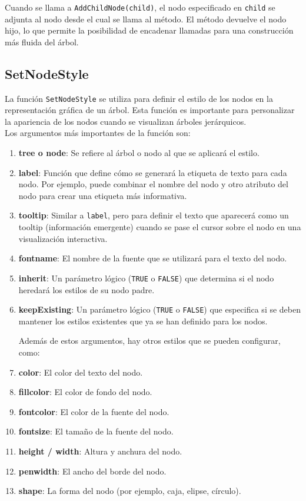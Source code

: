 \documentclass[12pt]{report}\usepackage[]{graphicx}\usepackage[dvipsnames]{xcolor}
\begin{document}
 	Cuando se llama a \texttt{AddChildNode(child)}, el nodo especificado en \texttt{child} se adjunta al nodo desde el cual se llama al método. El método devuelve el nodo hijo, lo que permite la posibilidad de encadenar llamadas para una construcción más fluida del árbol.
 	
 	\subsection{SetNodeStyle}
 	
 	La función \texttt{SetNodeStyle} se utiliza para definir el estilo de los nodos en la representación gráfica de un árbol. Esta función es importante para personalizar la apariencia de los nodos cuando se visualizan árboles jerárquicos.\\
 	
 	Los argumentos más importantes de la función son:
 	
 	\begin{enumerate}
 		\item \textbf{tree o node}: Se refiere al árbol o nodo al que se aplicará el estilo.
 		
 		\item \textbf{label}: Función que define cómo se generará la etiqueta de texto para cada nodo. Por ejemplo, puede combinar el nombre del nodo y otro atributo del nodo para crear una etiqueta más informativa.
 		
 		\item \textbf{tooltip}: Similar a \texttt{label}, pero para definir el texto que aparecerá como un tooltip (información emergente) cuando se pase el cursor sobre el nodo en una visualización interactiva.
 		
 		\item \textbf{fontname}: El nombre de la fuente que se utilizará para el texto del nodo.
 		
 		\item \textbf{inherit}: Un parámetro lógico (\texttt{TRUE} o \texttt{FALSE}) que determina si el nodo heredará los estilos de su nodo padre.
 		
 		\item \textbf{keepExisting}: Un parámetro lógico (\texttt{TRUE} o \texttt{FALSE}) que especifica si se deben mantener los estilos existentes que ya se han definido para los nodos.
 		
 		Además de estos argumentos, hay otros estilos que se pueden configurar, como:
 		
 		\item \textbf{color}: El color del texto del nodo.
 		\item \textbf{fillcolor}: El color de fondo del nodo.
 		\item \textbf{fontcolor}: El color de la fuente del nodo.
 		\item \textbf{fontsize}: El tamaño de la fuente del nodo.
 		\item \textbf{height / width}: Altura y anchura del nodo.
 		\item \textbf{penwidth}: El ancho del borde del nodo.
 		\item \textbf{shape}: La forma del nodo (por ejemplo, caja, elipse, círculo).
 	\end{enumerate}
 	
\end{document}
